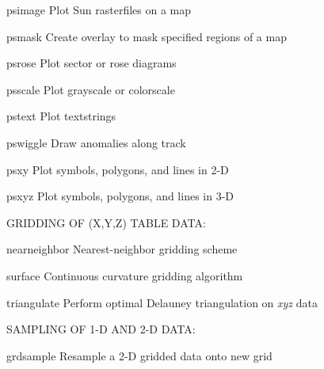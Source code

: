 \documentclass{article}
\begin{document}
\par 	psimage	Plot Sun rasterfiles on a map\par 

\par 	psmask	Create overlay to mask specified regions of a map\par 

\par 	psrose	Plot sector or rose diagrams\par 

\par 	psscale	Plot grayscale or colorscale\par 

\par 	pstext	Plot textstrings\par 

\par 	pswiggle	Draw anomalies along track\par 

\par 	psxy	Plot symbols, polygons, and lines in 2-D\par 

\par 	psxyz	Plot symbols, polygons, and lines in 3-D\par 

\par \par 

\par GRIDDING OF (X,Y,Z) TABLE DATA:\par 

\par 	nearneighbor	Nearest-neighbor gridding scheme\par 

\par 	surface	Continuous curvature gridding algorithm\par 

\par 	triangulate	Perform optimal Delauney triangulation on {\it xyz} data\par 

\par \par 

\par SAMPLING OF 1-D AND 2-D DATA:\par 

\par 	grdsample	Resample a 2-D gridded data onto new grid\par 
\end{document}
